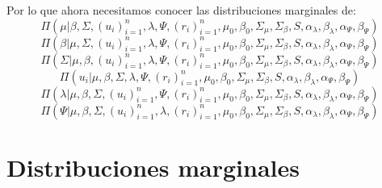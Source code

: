 \documentclass[11pt]{book}
\begin{document}
Por lo que ahora necesitamos conocer las distribuciones marginales de:
\begin{equation*}
\Pi(\mu|\beta,\Sigma,(u_{i})_{i=1}^{n},\lambda,\Psi,(r_{i})_{i=1}^{n},\mu_{0},\beta_{0},\Sigma_{\mu},\Sigma_{\beta},S,\alpha_{\lambda},\beta_{\lambda},\alpha_{\Psi},\beta_{\Psi}) 
\end{equation*}
\begin{equation*}
\Pi(\beta|\mu,\Sigma,(u_{i})_{i=1}^{n},\lambda,\Psi,(r_{i})_{i=1}^{n},\mu_{0},\beta_{0},\Sigma_{\mu},\Sigma_{\beta},S,\alpha_{\lambda},\beta_{\lambda},\alpha_{\Psi},\beta_{\Psi}) 
\end{equation*}
\begin{equation*}
\Pi(\Sigma|\mu,\beta,(u_{i})_{i=1}^{n},\lambda,\Psi,(r_{i})_{i=1}^{n},\mu_{0},\beta_{0},\Sigma_{\mu},\Sigma_{\beta},S,\alpha_{\lambda},\beta_{\lambda},\alpha_{\Psi},\beta_{\Psi}) 
\end{equation*}
\begin{equation*}
\Pi(u_{i}|\mu,\beta,\Sigma,\lambda,\Psi,(r_{i})_{i=1}^{n},\mu_{0},\beta_{0},\Sigma_{\mu},\Sigma_{\beta},S,\alpha_{\lambda},\beta_{\lambda},\alpha_{\Psi},\beta_{\Psi})
\end{equation*}
\begin{equation*}
\Pi(\lambda|\mu,\beta,\Sigma,(u_{i})_{i=1}^{n},\Psi,(r_{i})_{i=1}^{n},\mu_{0},\beta_{0},\Sigma_{\mu},\Sigma_{\beta},S,\alpha_{\lambda},\beta_{\lambda},\alpha_{\Psi},\beta_{\Psi}) 
\end{equation*}
\begin{equation*}
\Pi(\Psi|\mu,\beta,\Sigma,(u_{i})_{i=1}^{n},\lambda,(r_{i})_{i=1}^{n},\mu_{0},\beta_{0},\Sigma_{\mu},\Sigma_{\beta},S,\alpha_{\lambda},\beta_{\lambda},\alpha_{\Psi},\beta_{\Psi}) 
\end{equation*}


\section*{Distribuciones marginales}
\end{document}
